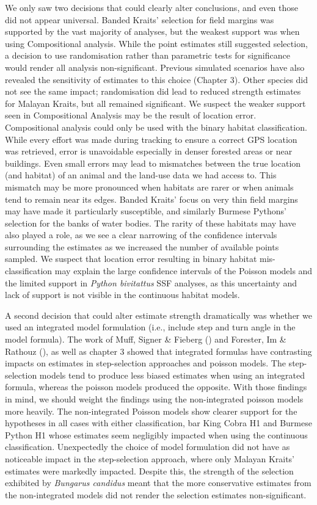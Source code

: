 \documentclass[10pt,a4paper]{article}
\begin{document}
We only saw two decisions that could clearly alter conclusions, and even those did not appear universal.
Banded Kraits' selection for field margins was supported by the vast majority of analyses, but the weakest support was when using Compositional analysis.
While the point estimates still suggested selection, a decision to use randomisation rather than parametric tests for significance would render all analysis non-significant.
Previous simulated scenarios have also revealed the sensitivity of estimates to this choice (Chapter 3).
Other species did not see the same impact; randomisation did lead to reduced strength estimates for Malayan Kraits, but all remained significant.
We suspect the weaker support seen in Compositional Analysis may be the result of location error.
Compositional analysis could only be used with the binary habitat classification.
While every effort was made during tracking to ensure a correct GPS location was retrieved, error is unavoidable especially in denser forested areas or near buildings.
Even small errors may lead to mismatches between the true location (and habitat) of an animal and the land-use data we had access to.
This mismatch may be more pronounced when habitats are rarer or when animals tend to remain near its edges.
Banded Kraits' focus on very thin field margins may have made it particularly susceptible, and similarly Burmese Pythons' selection for the banks of water bodies.
The rarity of these habitats may have also played a role, as we see a clear narrowing of the confidence intervals surrounding the estimates as we increased the number of available points sampled.
We suspect that location error resulting in binary habitat mis-classification may explain the large confidence intervals of the Poisson models and the limited support in \emph{Python bivitattus} SSF analyses, as this uncertainty and lack of support is not visible in the continuous habitat models.

A second decision that could alter estimate strength dramatically was whether we used an integrated model formulation (i.e., include step and turn angle in the model formula).
The work of Muff, Signer \& Fieberg () and Forester, Im \& Rathouz (), as well as chapter 3 showed that integrated formulas have contrasting impacts on estimates in step-selection approaches and poisson models.
The step-selection models tend to produce less biased estimates when using an integrated formula, whereas the poisson models produced the opposite.
With those findings in mind, we should weight the findings using the non-integrated poisson models more heavily.
The non-integrated Poisson models show clearer support for the hypotheses in all cases with either classification, bar King Cobra H1 and Burmese Python H1 whose estimates seem negligibly impacted when using the continuous classification.
Unexpectedly the choice of model formulation did not have as noticeable impact in the step-selection approach, where only Malayan Kraits' estimates were markedly impacted.
Despite this, the strength of the selection exhibited by \emph{Bungarus candidus} meant that the more conservative estimates from the non-integrated models did not render the selection estimates non-significant.
\end{document}
